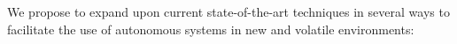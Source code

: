 



We propose to expand upon current state-of-the-art techniques in several ways to facilitate the use of autonomous systems in new and volatile environments:%

